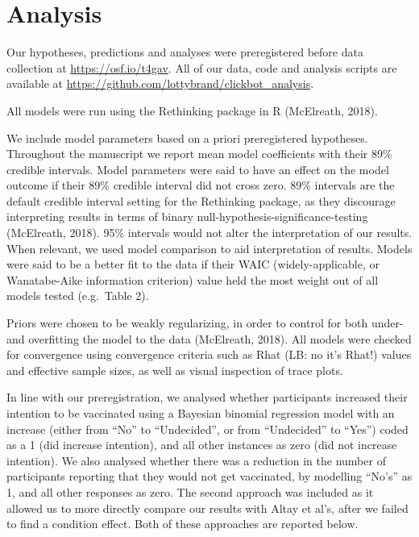 \documentclass[english,,jou,floatsintext]{apa6}
\begin{document}
\hypertarget{analysis}{%
\section{Analysis}\label{analysis}}

Our hypotheses, predictions and analyses were preregistered before data collection at \url{https://osf.io/t4gav}. All of our data, code and analysis scripts are available at \url{https://github.com/lottybrand/clickbot_analysis}.

All models were run using the Rethinking package in R (McElreath, 2018).

We include model parameters based on a priori preregistered hypotheses. Throughout the manuscript we report mean model coefficients with their 89\% credible intervals. Model parameters were said to have an effect on the model outcome if their 89\% credible interval did not cross zero. 89\% intervals are the default credible interval setting for the Rethinking package, as they discourage interpreting results in terms of binary null-hypothesis-significance-testing (McElreath, 2018). 95\% intervals would not alter the interpretation of our results. When relevant, we used model comparison to aid interpretation of results. Models were said to be a better fit to the data if their WAIC (widely-applicable, or Wanatabe-Aike information criterion) value held the most weight out of all models tested (e.g.~Table 2).

Priors were chosen to be weakly regularizing, in order to control for both under- and overfitting the model to the data (McElreath, 2018). All models were checked for convergence using convergence criteria such as Rhat (LB: no it's Rhat!) values and effective sample sizes, as well as visual inspection of trace plots.

In line with our preregistration, we analysed whether participants increased their intention to be vaccinated using a Bayesian binomial regression model with an increase (either from \enquote{No} to \enquote{Undecided}, or from \enquote{Undecided} to \enquote{Yes}) coded as a 1 (did increase intention), and all other instances as zero (did not increase intention). We also analysed whether there was a reduction in the number of participants reporting that they would not get vaccinated, by modelling \enquote{No's} as 1, and all other responses as zero. The second approach was included as it allowed us to more directly compare our results with Altay et al's, after we failed to find a condition effect. Both of these approaches are reported below.
\end{document}
